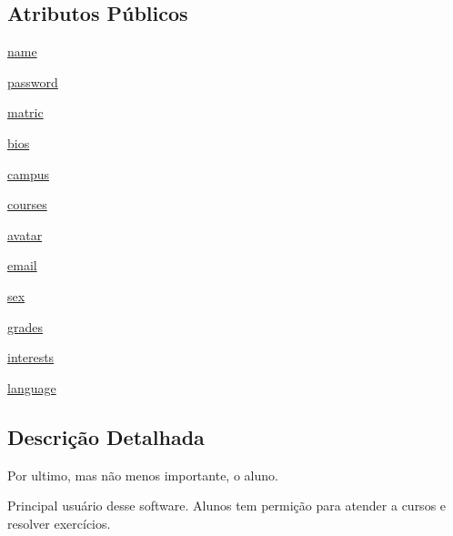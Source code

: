 \subsection*{Atributos Públicos}
\begin{DoxyCompactItemize}
\item 
\hyperlink{classELO_1_1EntityUnit_1_1Student_a33329ec1da0181f6305626b4444a8e0b}{name}
\item 
\hyperlink{classELO_1_1EntityUnit_1_1Student_a834cad492221bfe3f26e590666e13f9a}{password}
\item 
\hyperlink{classELO_1_1EntityUnit_1_1Student_a7a58dc9ae8d071372ef2036a82fcb3ae}{matric}
\item 
\hyperlink{classELO_1_1EntityUnit_1_1Student_a148e46f8d5bb2a3dedb9590edbb2471e}{bios}
\item 
\hyperlink{classELO_1_1EntityUnit_1_1Student_aeff51011a4e35705fb6aefc54e1d4f35}{campus}
\item 
\hyperlink{classELO_1_1EntityUnit_1_1Student_a4fc13f8b92b03ab40b6f97e753109056}{courses}
\item 
\hyperlink{classELO_1_1EntityUnit_1_1Student_a63479fe42a5a5e1dffc988221a807a6a}{avatar}
\item 
\hyperlink{classELO_1_1EntityUnit_1_1Student_ac072120adf3ee4078fe3ef7f17e61a1f}{email}
\item 
\hyperlink{classELO_1_1EntityUnit_1_1Student_a5ca85c1d00044512e5dc3cfabac4ff9f}{sex}
\item 
\hyperlink{classELO_1_1EntityUnit_1_1Student_a7ab2e46886024eced2bc61195dbc2008}{grades}
\item 
\hyperlink{classELO_1_1EntityUnit_1_1Student_a8777212f16975f658ff8f75e47f2c554}{interests}
\item 
\hyperlink{classELO_1_1EntityUnit_1_1Student_ad58a5d0f4e75b34e6c2b93ac05b59faf}{language}
\end{DoxyCompactItemize}


\subsection{Descrição Detalhada}
Por ultimo, mas não menos importante, o aluno. 

Principal usuário desse software. Alunos tem permição para atender a cursos e resolver exercícios. 

